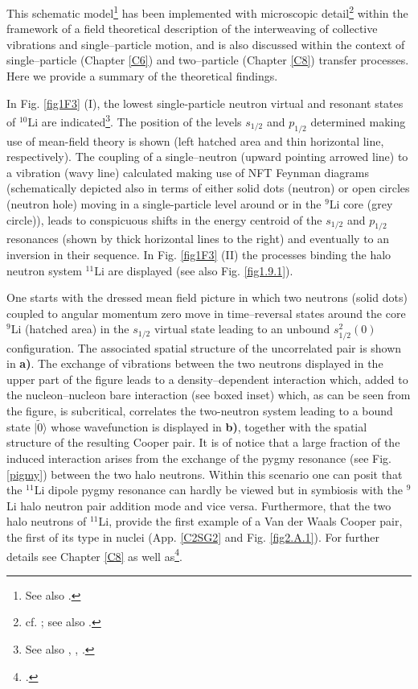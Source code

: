  
 
 This schematic model\footnote{See also \cite{Broglia:19b}.} has been implemented with microscopic detail\footnote{cf. \cite{Barranco:01}; see also \cite{Potel:10}.} within the framework of a field theoretical description of the interweaving of collective vibrations and single--particle motion, and is also discussed  within the context of single--particle (Chapter \ref{C6}) and two--particle (Chapter \ref{C8}) transfer processes. Here we provide a summary of the theoretical findings. 
 
 
 
 
 In Fig. \ref{fig1F3} (I), the lowest single-particle neutron virtual and resonant states of  $^{10}$Li are indicated\footnote{See also \cite{Cavallaro:17}, \cite{Barranco:19}, \cite{Moro:19}.}. The 
  position of the levels $s_{1/2}$ and $p_{1/2}$ determined making use
 of mean-field theory is shown (left hatched area and thin horizontal
 line, respectively). The coupling of a single--neutron (upward
 pointing arrowed line) to a vibration (wavy line) calculated
 making use of NFT Feynman diagrams 
 (schematically depicted also in terms of either solid dots (neutron)
 or open circles (neutron hole) moving in a single-particle
 level around or in the $^9$Li core (grey circle)), leads to conspicuous
 shifts in the energy centroid of the $s_{1/2}$ and $p_{1/2}$ resonances
 (shown by thick horizontal lines to the right) and eventually to
 an inversion in their sequence. In Fig. \ref{fig1F3} (II) the  processes binding the  halo neutron system $^{11}$Li are displayed (see also Fig. \ref{fig1.9.1}). 
 
 
 
 
 
  One starts with the dressed mean  field
 picture in which two neutrons (solid dots) coupled to angular momentum zero move in
 time--reversal states around the core $^{9}$Li (hatched area) in the
 $s_{1/2}$ virtual state leading to an unbound $s^2
 _{1/2}(0)$ configuration.  The associated spatial structure of the uncorrelated pair is shown in \textbf{a)}. The exchange
 of vibrations between the two neutrons displayed in the upper
 part of the figure leads to a density--dependent interaction
 which, added to the nucleon--nucleon bare interaction (see boxed inset) which, as can be seen from the figure, is subcritical, correlates the
 two-neutron system leading to a bound state $|\tilde 0\rangle$ whose wavefunction is  displayed in \textbf{b)}, together with the spatial structure of the resulting Cooper pair. It is of notice that a large fraction of the induced interaction arises from the exchange of the pygmy resonance (see Fig. \ref{pigmy}) between the two halo neutrons.  Within this scenario one can posit that the $^{11}$Li dipole pygmy resonance can hardly be viewed but in symbiosis with the $^{9}$Li halo neutron pair addition mode and vice versa. Furthermore, that the two halo neutrons of $^{11}$Li, provide the first example of a Van der Waals Cooper pair, the first of its type in nuclei (App. \ref{C2SG2} and Fig. \ref{fig2.A.1}). For further details see Chapter \ref{C8} as well as\footnote{\cite{Barranco:01}.}.
 

